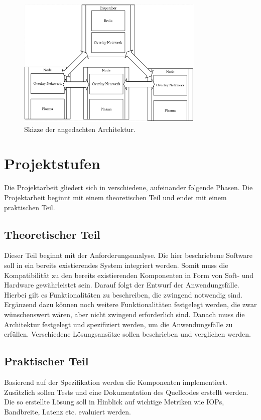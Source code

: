 \begin{figure}[htb]
	\begin{center}
		\includegraphics[width=0.8\textwidth]{bilder/Architektur.png}
		\caption{Skizze der angedachten Architektur.}\label{fig_Architektur}
	\end{center}
\end{figure}


\pagebreak
\section{Projektstufen}\raggedbottom
Die Projektarbeit gliedert sich in verschiedene, aufeinander folgende Phasen. Die Projektarbeit beginnt mit einem theoretischen Teil und endet mit einem praktischen Teil.
\subsection{Theoretischer Teil}
Dieser Teil beginnt mit der Anforderungsanalyse. Die hier beschriebene Software soll in ein bereits existierendes System integriert werden. Somit muss die Kompatibilität zu den bereits existierenden Komponenten in Form von Soft- und Hardware gewährleistet sein.
Darauf folgt der Entwurf der Anwendungsfälle. Hierbei gilt es Funktionalitäten zu beschreiben, die zwingend notwendig sind. Ergänzend dazu können noch weitere Funktionalitäten festgelegt werden, die zwar wünschenswert wären, aber nicht zwingend erforderlich sind. Danach muss die Architektur festgelegt und spezifiziert werden, um die Anwendungsfälle zu erfüllen. Verschiedene Lösungsansätze sollen beschrieben und verglichen werden.
\subsection{Praktischer Teil}
Basierend auf der Spezifikation werden die Komponenten implementiert. Zusätzlich sollen Tests und eine Dokumentation des Quellcodes erstellt werden. Die so erstellte Lösung soll in Hinblick auf wichtige Metriken wie IOPs, Bandbreite, Latenz etc. evaluiert werden.